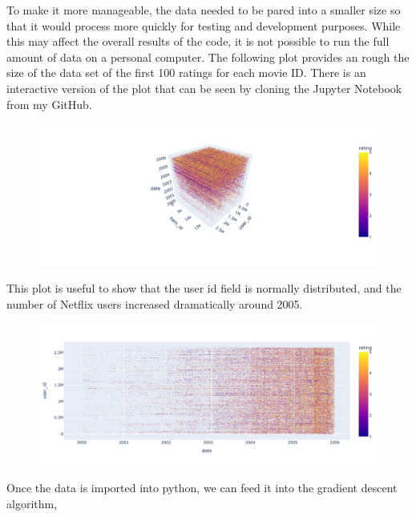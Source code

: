 \documentclass[11pt,a4paper]{article}
\begin{document}
\newpage

To make it more manageable, the data needed to be pared into a smaller size so that it would process more quickly for testing and development purposes. While this may affect the overall results of the code, it is not possible to run the full amount of data on a personal computer. The following plot provides an rough the size of the data set of the first 100 ratings for each movie ID. There is an interactive version of the plot that can be seen by cloning the Jupyter Notebook from my GitHub.

\begin{figure}[h]
    \centering
    \includegraphics[width=\textwidth]{3d_scatter_home.png}
\end{figure}

This plot is useful to show that the user id field is normally distributed, and the number of Netflix users increased dramatically around 2005.

\begin{figure}[h]
    \centering
    \includegraphics[width=\textwidth]{scatter_date_vs_user_id.png}
\end{figure}

\newpage
Once the data is imported into python, we can feed it into the gradient descent algorithm,
\end{document}
